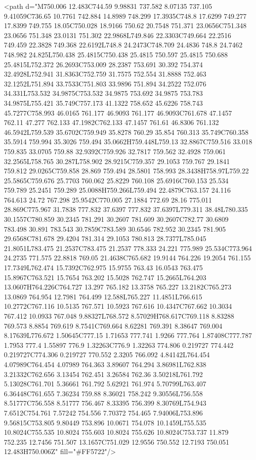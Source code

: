 <path d="M750.006 12.483C744.59 9.98831 737.582 8.07135 737.105 9.41059C736.65 10.7761 742.884 14.8989 748.299 17.3935C748.8 17.6299 749.277 17.8399 749.755 18.05C750.028 18.9166 750.62 20.7548 751.371 23.0656C751.348 23.0656 751.348 23.0131 751.302 22.9868L749.846 22.3303C749.664 22.2516 749.459 22.3828 749.368 22.6192L748.8 24.2473C748.709 24.4836 748.8 24.7462 748.982 24.825L750.438 25.4815C750.438 25.4815 750.597 25.4815 750.688 25.4815L752.372 26.2693C753.009 28.2387 753.691 30.392 754.374 32.4928L752.941 31.8363C752.759 31.7575 752.554 31.8888 752.463 32.1252L751.894 33.7533C751.803 33.9896 751.894 34.2522 752.076 34.331L753.532 34.9875C753.532 34.9875 753.692 34.9875 753.783 34.9875L755.421 35.749C757.173 41.1322 758.652 45.6226 758.743 45.7277C758.993 46.0165 761.177 46.9093 761.177 46.9093C761.678 47.1457 762.11 47.277 762.133 47.1982C762.133 47.1457 761.61 46.8306 761.132 46.5942L759.539 35.6702C759.949 35.8278 760.29 35.854 760.313 35.749C760.358 35.5914 759.994 35.3026 759.494 35.0662H759.448L759.13 32.8867C759.516 33.018 759.835 33.0705 759.88 32.9392C759.926 32.7817 759.562 32.4928 759.061 32.2565L758.765 30.287L758.902 28.9215C759.357 29.1053 759.767 29.1841 759.812 29.0265C759.858 28.869 759.494 28.5801 758.993 28.3438H758.97L759.22 25.5865C759.676 25.7703 760.062 25.8229 760.108 25.6916C760.153 25.534 759.789 25.2451 759.289 25.0088H759.266L759.494 22.4879C763.157 24.116 764.613 24.72 767.298 25.9542C770.005 27.1884 772.69 28.16 775.011 28.869C775.967 31.7838 777.832 37.6397 777.832 37.6397L779.311 38.48L780.335 30.1557C780.859 30.2345 781.291 30.2607 781.609 30.2607C782.77 30.6809 783.498 30.891 783.543 30.7859C783.589 30.6546 782.952 30.2345 781.905 29.6568C781.678 29.4204 781.314 29.1053 780.813 28.7377L785.045 21.8051L783.475 21.2537C783.475 21.2537 778.333 24.221 775.989 25.534C773.964 24.2735 771.575 22.8818 769.05 21.4638C765.682 19.9144 764.226 19.2054 761.155 17.7349L762.474 15.7392C762.975 15.9755 763.43 16.0543 763.475 15.8967C763.521 15.7654 763.202 15.5028 762.747 15.2665L764.203 13.0607H764.226C764.727 13.297 765.182 13.3758 765.227 13.2182C765.273 13.0869 764.954 12.7981 764.499 12.588L765.227 11.4851L766.615 10.2772C767.116 10.5135 767.571 10.5923 767.616 10.4347C767.662 10.3034 767.412 10.0933 767.048 9.88327L768.572 8.57029H768.617C769.118 8.83288 769.573 8.8854 769.619 8.7541C769.664 8.62281 769.391 8.38647 769.004 8.17639L776.672 1.50645C777.15 1.71653 777.741 1.9266 777.764 1.87408C777.787 1.7953 777.4 1.55897 776.9 1.32263C776.9 1.32263 774.806 0.219727 774.442 0.219727C774.306 0.219727 770.552 2.3205 766.092 4.84142L764.454 4.07989C764.454 4.07989 764.363 3.89607 764.294 3.86981L762.838 3.21332C762.656 3.13454 762.451 3.26584 762.36 3.50218L761.792 5.13028C761.701 5.36661 761.792 5.62921 761.974 5.70799L763.407 6.36448C761.655 7.36234 759.88 8.36021 758.242 9.30556L756.558 8.51777C756.558 8.51777 756.467 8.33395 756.399 8.30769L754.943 7.6512C754.761 7.57242 754.556 7.70372 754.465 7.94006L753.896 9.56815C753.805 9.80449 753.896 10.0671 754.078 10.1459L755.535 10.8024C755.535 10.8024 755.603 10.8024 755.626 10.8024C753.737 11.879 752.235 12.7456 751.507 13.1657C751.029 12.9556 750.552 12.7193 750.051 12.483H750.006Z" fill="#FF5722"/>
